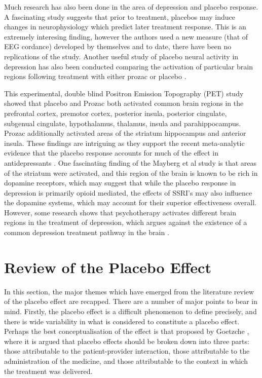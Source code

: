 Much research  has also been done in the area of depression and placebo response.  A fascinating study \cite{Hunter2006}  suggests that prior to treatment, placebos may induce changes in neurophysiology which predict later treatment response. This is an extremely interesing finding, however the authors used a new measure (that of EEG cordance) developed by themselves and to date, there have been no replications of the study. Another useful study of placebo neural activity in depression has also been conducted comparing the activation of particular brain regions following treatment with either prozac or placebo \cite{Mayberg2002}.

 This experimental, double blind Positron Emission Topography (PET) study showed that placebo and Prozac both activated common brain regions in the prefrontal cortex, premotor cortex, posterior insula, posterior cingulate, subgenual cingulate, hypothalamus, thalamus, insula and parahippocampus. Prozac additionally activated areas of the striatum hippocampus and anterior insula. These findings are intriguing as they support the recent meta-analytic evidence that the placebo response accounts for much of the effect in antidepressants \cite{Kirsch2002a}. One fascinating finding of the Mayberg et al study is that areas of the striatum were activated, and this region of the brain is known to be rich in dopamine receptors, which may suggest that while the placebo response in depression is primarily opioid mediated, the effects of SSRI's may also influence the dopamine systems, which may account for their  superior effectiveness overall. However, some research shows that psychotherapy activates different brain regions in the treatment of depression, which argues against the existence of a common depression treatment pathway in the brain \cite{Benedetti2008}.

\section{Review of the Placebo Effect}
\label{sec:revi-plac-effect}

In this section, the major themes which have emerged from the literature review of the placebo effect are recapped. There are a number of major points to bear in mind. Firstly, the placebo effect is a difficult phenomenon to define precisely, and there is wide variability in what is considered to constitute a placebo effect. Perhaps the best conceptualisation of the effect is that proposed by Goetzche \cite{Gotzsche1995}, where it is argued that placebo effects should be broken down into three parts: those attributable to the patient-provider interaction, those attributable to the administration of the medicine, and those attributable to the context in which the treatment was delivered. 

